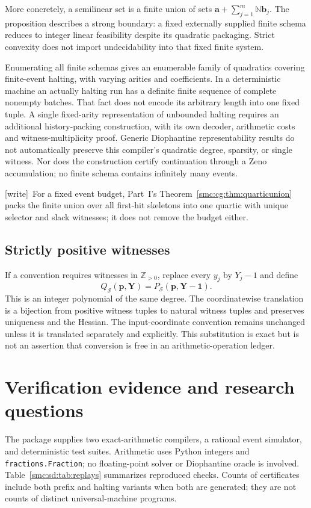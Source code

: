 \documentclass[11pt,letterpaper]{article}
\numberwithin{equation}{section}
\theoremstyle{definition}
\theoremstyle{remark}
\newcommand{\Z}{\mathbb Z}
\newcommand{\NN}{\mathbb N}
\newcommand{\cS}{\mathcal S}
\newcommand{\wtag}{\textup{[write]}}
\begin{document}
More concretely, a semilinear set is a finite union of sets $\mathbf a+\sum_{j=1}^m\NN\mathbf b_j$. The proposition describes a strong boundary: a fixed externally supplied finite schema reduces to integer linear feasibility despite its quadratic packaging. Strict convexity does not import undecidability into that fixed finite system.

Enumerating all finite schemas gives an enumerable family of quadratics covering finite-event halting, with varying arities and coefficients. In a deterministic machine an actually halting run has a definite finite sequence of complete nonempty batches. That fact does not encode its arbitrary length into one fixed tuple. A single fixed-arity representation of unbounded halting requires an additional history-packing construction, with its own decoder, arithmetic costs and witness-multiplicity proof. Generic Diophantine representability results do not automatically preserve this compiler's quadratic degree, sparsity, or single witness. Nor does the construction certify continuation through a Zeno accumulation; no finite schema contains infinitely many events.


\wtag\ For a fixed event budget, Part~I's Theorem~\ref{smc:cg:thm:quarticunion} packs the finite union over all first-hit skeletons into one quartic with unique selector and slack witnesses; it does not remove the budget either.

\subsection{Strictly positive witnesses}
If a convention requires witnesses in $\Z_{>0}$, replace every $y_j$ by $Y_j-1$ and define
\[
 Q_{\cS}(\mathbf p,\mathbf Y)=P_{\cS}(\mathbf p,\mathbf Y-\mathbf1).
\]
This is an integer polynomial of the same degree. The coordinatewise translation is a bijection from positive witness tuples to natural witness tuples and preserves uniqueness and the Hessian. The input-coordinate convention remains unchanged unless it is translated separately and explicitly. This substitution is exact but is not an assertion that conversion is free in an arithmetic-operation ledger.

\section{Verification evidence and research questions}\label{smc:sd:sec:verification}
The package supplies two exact-arithmetic compilers, a rational event simulator, and deterministic test suites. Arithmetic uses Python integers and \texttt{fractions.Fraction}; no floating-point solver or Diophantine oracle is involved. Table~\ref{smc:sd:tab:replays} summarizes reproduced checks. Counts of certificates include both prefix and halting variants when both are generated; they are not counts of distinct universal-machine programs.
\end{document}
